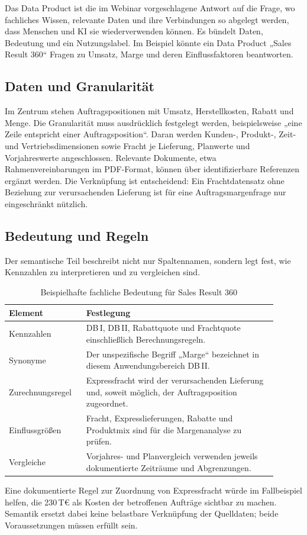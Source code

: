 \documentclass[a4paper,12pt]{article}
\theoremstyle{definition}
\begin{document}
Das Data Product ist die im Webinar vorgeschlagene Antwort auf die Frage, wo fachliches Wissen, relevante Daten und ihre Verbindungen so abgelegt werden, dass Menschen und KI sie wiederverwenden können. Es bündelt Daten, Bedeutung und ein Nutzungslabel. Im Beispiel könnte ein Data Product „Sales Result 360“ Fragen zu Umsatz, Marge und deren Einflussfaktoren beantworten.

\subsection{Daten und Granularität}
Im Zentrum stehen Auftragspositionen mit Umsatz, Herstellkosten, Rabatt und Menge. Die Granularität muss ausdrücklich festgelegt werden, beispielsweise „eine Zeile entspricht einer Auftragsposition“. Daran werden Kunden-, Produkt-, Zeit- und Vertriebsdimensionen sowie Fracht je Lieferung, Planwerte und Vorjahreswerte angeschlossen. Relevante Dokumente, etwa Rahmenvereinbarungen im PDF-Format, können über identifizierbare Referenzen ergänzt werden. Die Verknüpfung ist entscheidend: Ein Frachtdatensatz ohne Beziehung zur verursachenden Lieferung ist für eine Auftragsmargenfrage nur eingeschränkt nützlich.

\subsection{Bedeutung und Regeln}
Der semantische Teil beschreibt nicht nur Spaltennamen, sondern legt fest, wie Kennzahlen zu interpretieren und zu vergleichen sind.
\begin{table}[htbp]
\centering
\small
\caption{Beispielhafte fachliche Bedeutung für Sales Result 360}
\label{tab:meaning}
\begin{tabular}{p{0.25\linewidth}p{0.65\linewidth}}
\toprule
\textbf{Element} & \textbf{Festlegung} \\
\midrule
Kennzahlen & DB\,I, DB\,II, Rabattquote und Frachtquote einschließlich Berechnungsregeln. \\
Synonyme & Der unspezifische Begriff „Marge“ bezeichnet in diesem Anwendungsbereich DB\,II. \\
Zurechnungsregel & Expressfracht wird der verursachenden Lieferung und, soweit möglich, der Auftragsposition zugeordnet. \\
Einflussgrößen & Fracht, Expresslieferungen, Rabatte und Produktmix sind für die Margenanalyse zu prüfen. \\
Vergleiche & Vorjahres- und Planvergleich verwenden jeweils dokumentierte Zeiträume und Abgrenzungen. \\
\bottomrule
\end{tabular}
\end{table}
Eine dokumentierte Regel zur Zuordnung von Expressfracht würde im Fallbeispiel helfen, die 230\,T€ als Kosten der betroffenen Aufträge sichtbar zu machen. Semantik ersetzt dabei keine belastbare Verknüpfung der Quelldaten; beide Voraussetzungen müssen erfüllt sein.
\end{document}
